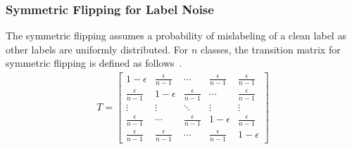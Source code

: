\documentclass[sigconf]{acmart}
\begin{document}
\subsubsection{Symmetric Flipping for Label Noise}
The symmetric flipping assumes a probability of mislabeling of a clean label as other labels are uniformly distributed. For $n$ classes, the transition matrix for symmetric flipping is defined as follows~\cite{symm}.
\begin{align*}
T=\left[\begin{array}{ccccc}
1-\epsilon & \frac{\epsilon}{n-1} & \cdots & \frac{\epsilon}{n-1} & \frac{\epsilon}{n-1} \\
\frac{\epsilon}{n-1} & 1-\epsilon & \frac{\epsilon}{n-1} & \cdots & \frac{\epsilon}{n-1} \\
\vdots & \vdots & \ddots & \vdots & \vdots \\
\frac{\epsilon}{n-1} & \cdots & \frac{\epsilon}{n-1} & 1-\epsilon & \frac{\epsilon}{n-1} \\
\frac{\epsilon}{n-1} & \frac{\epsilon}{n-1} & \cdots & \frac{\epsilon}{n-1} & 1-\epsilon
\end{array}\right]
\end{align*} \\
\end{document}
